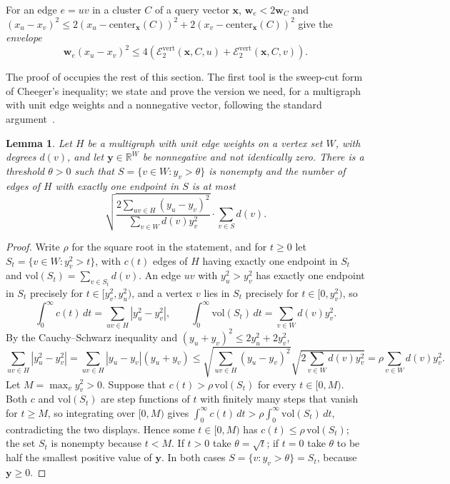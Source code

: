 \documentclass[11pt]{article}
\newtheorem{lemma}[theorem]{Lemma}
\theoremstyle{remark}
\newcommand{\ww}{\mathbf w}
\newcommand{\xx}{\mathbf x}
\newcommand{\yy}{\mathbf y}
\newcommand{\Ecalvert}[1]{\mathcal{E}^{\mathrm{vert}}_{#1}}
\newcommand{\R}{\mathbb R}
\begin{document}
For an edge $e = uv$ in a cluster $C$ of a query vector $\xx$,
$\ww_e < 2\ww_C$ and
$(x_u - x_v)^{2}
\le 2(x_u - \mathrm{center}_{\xx}(C))^{2}
+ 2(x_v - \mathrm{center}_{\xx}(C))^{2}$
give the \emph{envelope}
\begin{equation}
\label{eq:envelope}
\ww_e (x_u - x_v)^{2}
\le 4 \left( \Ecalvert{2}(\xx, C, u) + \Ecalvert{2}(\xx, C, v) \right).
\end{equation}

The proof of  occupies the rest of this section.
The first tool is the sweep-cut form of Cheeger's inequality; we state and
prove the version we need, for a multigraph with unit edge weights and a
nonnegative vector, following the standard argument~\cite{C97:book}.

\begin{lemma}
\label{lem:cheeger}
Let $H$ be a multigraph with unit edge weights on a vertex set $W$, with
degrees $d(v)$, and let $\yy \in \R^{W}$ be nonnegative and not identically
zero.
There is a threshold $\theta > 0$ such that
$S = \{ v \in W : y_v > \theta \}$ is nonempty and the number of edges of
$H$ with exactly one endpoint in $S$ is at most
\[
\sqrt{ \frac{ 2 \sum_{uv \in H} (y_u - y_v)^{2} }
{ \sum_{v \in W} d(v) y_v^{2} } }
\cdot \sum_{v \in S} d(v) .
\]
\end{lemma}

\begin{proof}
Write $\rho$ for the square root in the statement, and for $t \ge 0$ let
$S_t = \{ v \in W : y_v^{2} > t \}$, with $c(t)$ edges of $H$ having
exactly one endpoint in $S_t$ and $\mathrm{vol}(S_t) = \sum_{v \in S_t} d(v)$.
An edge $uv$ with $y_u^{2} > y_v^{2}$ has exactly one endpoint in $S_t$
precisely for $t \in [y_v^{2}, y_u^{2})$, and a vertex $v$ lies in $S_t$
precisely for $t \in [0, y_v^{2})$, so
\[
\int_{0}^{\infty} c(t) \, dt
= \sum_{uv \in H} \left| y_u^{2} - y_v^{2} \right| ,
\qquad
\int_{0}^{\infty} \mathrm{vol}(S_t) \, dt
= \sum_{v \in W} d(v) y_v^{2} .
\]
By the Cauchy--Schwarz inequality and $(y_u + y_v)^{2} \le 2y_u^{2} + 2y_v^{2}$,
\[
\sum_{uv \in H} \left| y_u^{2} - y_v^{2} \right|
= \sum_{uv \in H} |y_u - y_v| (y_u + y_v)
\le \sqrt{ \sum_{uv \in H} (y_u - y_v)^{2} }
\sqrt{ 2 \sum_{v \in W} d(v) y_v^{2} }
= \rho \sum_{v \in W} d(v) y_v^{2} .
\]
Let $M = \max_v y_v^{2} > 0$.
Suppose that $c(t) > \rho \, \mathrm{vol}(S_t)$ for every $t \in [0, M)$.
Both $c$ and $\mathrm{vol}(S_t)$ are step functions of $t$ with finitely
many steps that vanish for $t \ge M$, so integrating over $[0, M)$ gives
$\int_{0}^{\infty} c(t)\, dt > \rho \int_{0}^{\infty} \mathrm{vol}(S_t)\, dt$,
contradicting the two displays.
Hence some $t \in [0, M)$ has $c(t) \le \rho \, \mathrm{vol}(S_t)$;
the set $S_t$ is nonempty because $t < M$.
If $t > 0$ take $\theta = \sqrt{t}$; if $t = 0$ take $\theta$ to be half the
smallest positive value of $\yy$.
In both cases $S = \{ v : y_v > \theta \} = S_t$, because $\yy \ge 0$.
\end{proof}
\end{document}
